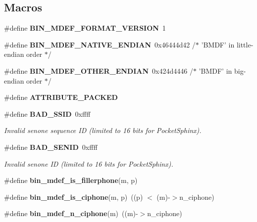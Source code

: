 \subsection*{Macros}
\begin{DoxyCompactItemize}
\item 
\#define {\bfseries B\-I\-N\-\_\-\-M\-D\-E\-F\-\_\-\-F\-O\-R\-M\-A\-T\-\_\-\-V\-E\-R\-S\-I\-O\-N}~1\label{bin__mdef_8h_a200a7e1836fa80ffe56b15334b1a8d1d}

\item 
\#define {\bfseries B\-I\-N\-\_\-\-M\-D\-E\-F\-\_\-\-N\-A\-T\-I\-V\-E\-\_\-\-E\-N\-D\-I\-A\-N}~0x46444d42 /$\ast$ '\-B\-M\-D\-F' in little-\/endian order $\ast$/\label{bin__mdef_8h_a9d58ffda11ea44f2681848072cb64ddd}

\item 
\#define {\bfseries B\-I\-N\-\_\-\-M\-D\-E\-F\-\_\-\-O\-T\-H\-E\-R\-\_\-\-E\-N\-D\-I\-A\-N}~0x424d4446  /$\ast$ '\-B\-M\-D\-F' in big-\/endian order $\ast$/\label{bin__mdef_8h_aafe4efcf837bc5c4b2392cd7e77c1ebd}

\item 
\#define {\bfseries A\-T\-T\-R\-I\-B\-U\-T\-E\-\_\-\-P\-A\-C\-K\-E\-D}\label{bin__mdef_8h_ad93e9ac33d1a9153bbea517a98260041}

\item 
\#define {\bf B\-A\-D\-\_\-\-S\-S\-I\-D}~0xffff\label{bin__mdef_8h_a8ee283c316e9f4aa8e6d18c1d44026bc}

\begin{DoxyCompactList}\small\item\em Invalid senone sequence I\-D (limited to 16 bits for Pocket\-Sphinx). \end{DoxyCompactList}\item 
\#define {\bf B\-A\-D\-\_\-\-S\-E\-N\-I\-D}~0xffff\label{bin__mdef_8h_ab6c771eca798ab8c94e0933a1f8daafc}

\begin{DoxyCompactList}\small\item\em Invalid senone I\-D (limited to 16 bits for Pocket\-Sphinx). \end{DoxyCompactList}\item 
\#define {\bfseries bin\-\_\-mdef\-\_\-is\-\_\-fillerphone}(m, p)
\item 
\#define {\bfseries bin\-\_\-mdef\-\_\-is\-\_\-ciphone}(m, p)~((p) $<$ (m)-\/$>$n\-\_\-ciphone)\label{bin__mdef_8h_ad1440dcf8f6df7daf54dca1c85b7aa9e}

\item 
\#define {\bfseries bin\-\_\-mdef\-\_\-n\-\_\-ciphone}(m)~((m)-\/$>$n\-\_\-ciphone)\label{bin__mdef_8h_a3bf9a556739b5b6651eb2bfa72fcb427}


\end{DoxyCompactItemize}
